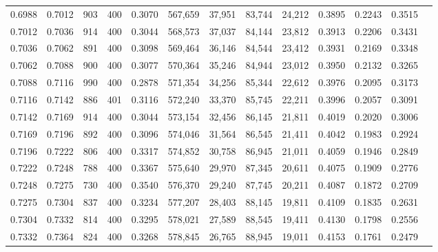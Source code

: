 \begin{tabular}{rrrrrrrrrrrrr}
0.6988 & 0.7012 &    903 & 400 &                                     0.3070 & 567,659 &  37,951 &  83,744 &  24,212 & 0.3895 & 0.2243 & 0.3515 \\
0.7012 & 0.7036 &    914 & 400 &                                     0.3044 & 568,573 &  37,037 &  84,144 &  23,812 & 0.3913 & 0.2206 & 0.3431 \\
0.7036 & 0.7062 &    891 & 400 &                                     0.3098 & 569,464 &  36,146 &  84,544 &  23,412 & 0.3931 & 0.2169 & 0.3348 \\
0.7062 & 0.7088 &    900 & 400 &                                     0.3077 & 570,364 &  35,246 &  84,944 &  23,012 & 0.3950 & 0.2132 & 0.3265 \\
0.7088 & 0.7116 &    990 & 400 &                                     0.2878 & 571,354 &  34,256 &  85,344 &  22,612 & 0.3976 & 0.2095 & 0.3173 \\
0.7116 & 0.7142 &    886 & 401 &                                     0.3116 & 572,240 &  33,370 &  85,745 &  22,211 & 0.3996 & 0.2057 & 0.3091 \\
0.7142 & 0.7169 &    914 & 400 &                                     0.3044 & 573,154 &  32,456 &  86,145 &  21,811 & 0.4019 & 0.2020 & 0.3006 \\
0.7169 & 0.7196 &    892 & 400 &                                     0.3096 & 574,046 &  31,564 &  86,545 &  21,411 & 0.4042 & 0.1983 & 0.2924 \\
0.7196 & 0.7222 &    806 & 400 &                                     0.3317 & 574,852 &  30,758 &  86,945 &  21,011 & 0.4059 & 0.1946 & 0.2849 \\
0.7222 & 0.7248 &    788 & 400 &                                     0.3367 & 575,640 &  29,970 &  87,345 &  20,611 & 0.4075 & 0.1909 & 0.2776 \\
0.7248 & 0.7275 &    730 & 400 &                                     0.3540 & 576,370 &  29,240 &  87,745 &  20,211 & 0.4087 & 0.1872 & 0.2709 \\
0.7275 & 0.7304 &    837 & 400 &                                     0.3234 & 577,207 &  28,403 &  88,145 &  19,811 & 0.4109 & 0.1835 & 0.2631 \\
0.7304 & 0.7332 &    814 & 400 &                                     0.3295 & 578,021 &  27,589 &  88,545 &  19,411 & 0.4130 & 0.1798 & 0.2556 \\
0.7332 & 0.7364 &    824 & 400 &                                     0.3268 & 578,845 &  26,765 &  88,945 &  19,011 & 0.4153 & 0.1761 & 0.2479 \\

\end{tabular}
